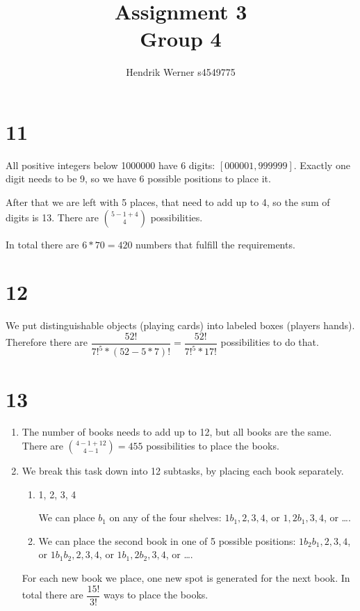 \documentclass[12pt]{article}
\title{Assignment 3\\Group 4}
\author{
	Hendrik Werner s4549775
}
\begin{document}
\maketitle

\section*{11}
All positive integers below 1000000 have 6 digits: $[000001, 999999]$. Exactly one digit needs to be 9, so we have 6 possible positions to place it.

After that we are left with 5 places, that need to add up to 4, so the sum of digits is 13. There are $\binom{5 - 1 + 4}{4}$ possibilities.

In total there are $6 * 70 = 420$ numbers that fulfill the requirements.

\section*{12}
We put distinguishable objects (playing cards) into labeled boxes (players hands). Therefore there are $\dfrac{52!}{7!^5 * (52 - 5 * 7)!} =  \dfrac{52!}{7!^5 * 17!}$ possibilities to do that.

\section*{13}
\begin{enumerate}[a]
	\item %
	The number of books needs to add up to 12, but all books are the same. There are $\binom{4 - 1 + 12}{4 - 1} = 455$ possibilities to place the books.

	\item %
	We break this task down into 12 subtasks, by placing each book separately.

	\begin{enumerate}
		\item 1, 2, 3, 4

		We can place $b_1$ on any of the four shelves: $1 b_1, 2, 3, 4$, or $1, 2 b_1, 3, 4$, or \dots.
		\item
		We can place the second book in one of 5 possible positions: $1 b_2 b_1, 2, 3, 4$, or $1 b_1 b_2, 2, 3, 4$, or $1 b_1, 2 b_2, 3, 4$, or \dots.
	\end{enumerate}

	For each new book we place, one new spot is generated for the next book. In total there are $\dfrac{15!}{3!}$ ways to place the books.
\end{enumerate}
\end{document}
